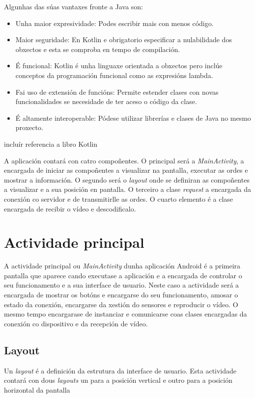 Algunhas das súas vantaxes fronte a Java son:
\begin{itemize}
    \item Unha maior expresividade: Podes escribir mais con menos código.
    \item Maior seguridade: En Kotlin e obrigatorio especificar a nulabilidade dos obxectos e esta se comproba en tempo de compilación.
    \item É funcional: Kotlin é unha linguaxe orientada a obxectos pero inclúe conceptos da programación funcional como as expresións lambda.
    \item Fai uso de extensión de funcións: Permite estender clases con novas funcionalidades se necesidade de ter aceso o código da clase.
    \item É altamente interoperable: Pódese utilizar librerías e clases de Java no mesmo proxecto.
\end{itemize}
incluír referencia a libro Kotlin

A aplicación contará con catro compoñentes. O principal será a \emph{MainActivity}, a encargada de iniciar as compoñentes a visualizar na pantalla, executar as ordes e mostrar a información. O segundo será o \emph{layout} onde se definiran as compoñentes a visualizar e a sua posición en pantalla. O terceiro a clase \emph{request} a encargada da conexión co servidor e de transmitirlle as ordes. O cuarto elemento é a clase encargada de recibir o vídeo e descodificalo.

\section{Actividade principal}
A actividade principal ou \emph{MainActivity} dunha aplicación Android é a primeira pantalla que aparece cando executase a aplicación e a encargada de controlar o seu funcionamento e a sua interface de usuario. Neste caso a actividade será a encargada de mostrar os botóns e encargarse do seu funcionamento, amosar o estado da conexión, encargarse da xestión do sensores e reproducir o vídeo. O mesmo tempo encargarase de instanciar e comunicarse coas clases encargadas da conexión co dispositivo e da recepción de vídeo.

\subsection{Layout}
Un \emph{layout} é a definición da estrutura da interface de usuario. Esta actividade contará con dous \emph{layouts} un para a posición vertical e outro para a posición horizontal da pantalla
